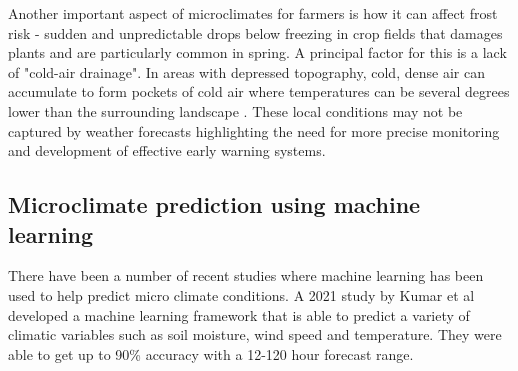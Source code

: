Another important aspect of microclimates for farmers is how it can affect frost
risk - sudden and unpredictable drops below freezing in crop fields that damages
plants and are particularly common in spring. A principal factor for this is a
lack of "cold-air drainage". In areas with depressed topography, cold, dense air
can accumulate to form pockets of cold air where temperatures can be several
degrees lower than the surrounding landscape \cite{drepper2022}. These local
conditions may not be captured by weather forecasts highlighting the need for
more precise monitoring and development of effective early warning systems.

\subsection{Microclimate prediction using machine learning}

There have been a number of recent studies where machine learning has been used
to help predict micro climate conditions. A 2021 study by Kumar et al developed
a machine learning framework that is able to predict a variety of climatic
variables such as soil moisture, wind speed and temperature. They were able to
get up to 90\% accuracy with a 12-120 hour forecast range.



